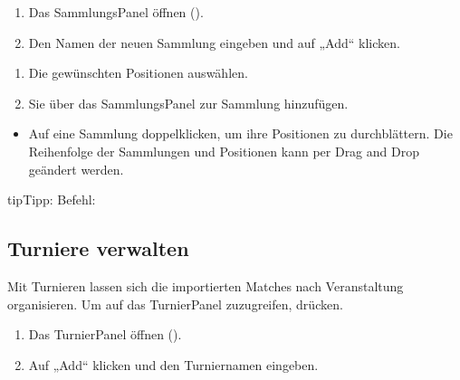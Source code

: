 \documentclass[letterpaper,10pt,german]{sphinxmanual}
\begin{document}
\sphinxAtStartPar
{}
\begin{enumerate}
%
\item {} 
\sphinxAtStartPar
Das Sammlungs\sphinxhyphen{}Panel öffnen ().

\item {} 
\sphinxAtStartPar
Den Namen der neuen Sammlung eingeben und auf „Add“ klicken.

\end{enumerate}

\sphinxAtStartPar
{}
\begin{enumerate}
%
\item {} 
\sphinxAtStartPar
Die gewünschten Positionen auswählen.

\item {} 
\sphinxAtStartPar
Sie über das Sammlungs\sphinxhyphen{}Panel zur Sammlung hinzufügen.

\end{enumerate}

\sphinxAtStartPar
{}
\begin{itemize}
\item {} 
\sphinxAtStartPar
Auf eine Sammlung doppelklicken, um ihre Positionen zu durchblättern. Die Reihenfolge der Sammlungen und Positionen kann per Drag and Drop geändert werden.

\end{itemize}

\begin{sphinxadmonition}{tip}{Tipp:}
\sphinxAtStartPar
Befehl: 
\end{sphinxadmonition}


\subsection{Turniere verwalten}
\label{\detokenize{guide_utilisateur:gerer-les-tournois}}
\sphinxAtStartPar
Mit Turnieren lassen sich die importierten Matches nach Veranstaltung organisieren. Um auf das Turnier\sphinxhyphen{}Panel zuzugreifen,  drücken.

\sphinxAtStartPar
{}
\begin{enumerate}
%
\item {} 
\sphinxAtStartPar
Das Turnier\sphinxhyphen{}Panel öffnen ().

\item {} 
\sphinxAtStartPar
Auf „Add“ klicken und den Turniernamen eingeben.

\end{enumerate}
\end{document}
